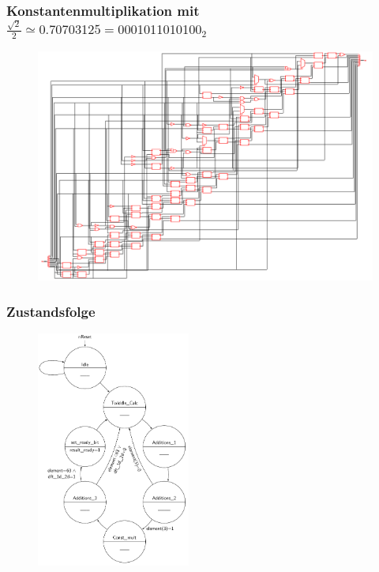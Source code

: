 \begin{frame}\frametitle{Konstantenmultiplikation mit $\frac{\sqrt{2}}{2} \simeq 0.70703125 = 0001011010100_2$}
 \begin{figure}[!ht]
\centering  
  \includegraphics[width=1\textwidth]{img/13Bit_Konstantenmultiplizierer_neu.png}
  \label{pic:Konstantenmultiplizierer}
\end{figure}
\end{frame}



\begin{frame}\frametitle{Zustandsfolge}
 \begin{figure}
  \centering
  \includegraphics[width=0.45\textwidth]{img/Zustandsfolge.png}
 \end{figure}
\end{frame}




